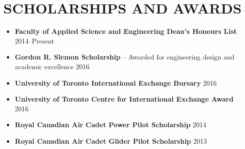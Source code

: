 \documentclass{ResumeTemplate}
\begin{document}
    

    \section{SCHOLARSHIPS AND AWARDS}
    \begin{itemize}[noitemsep, leftmargin=*]
        \item \textbf{Faculty of Applied Science and Engineering Dean's Honours List} \hfill 2014--Present
        \item \textbf{Gordon R. Slemon Scholarship} -- Awarded for engineering design and academic excellence \hfill 2016
        \item \textbf{University of Toronto International Exchange Bursary} \hfill 2016
        \item \textbf{University of Toronto Centre for International Exchange Award} \hfill 2016
        \item \textbf{Royal Canadian Air Cadet Power Pilot Scholarship} \hfill 2014
        \item \textbf{Royal Canadian Air Cadet Glider Pilot Scholarship} \hfill 2013
    \end{itemize}
\end{document}
